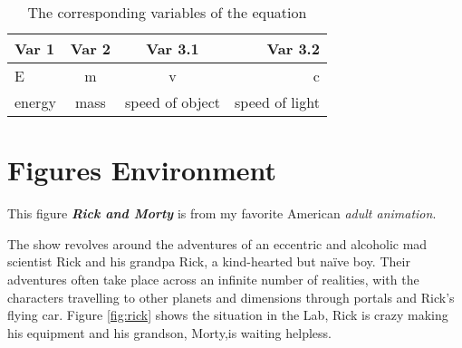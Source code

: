 \documentclass[12pt, letterpaper]{article} %
\begin{document}
\begin{table}[!h] %
  \begin{center} %
  \begin{tabular}{|l|c|c|r|} %
    \hline %
    Var 1 & Var 2 & Var 3.1 & Var 3.2\\ %
    \hline %
    \hline %
    E & m &v & c\\ %
    \hline %
    \hline %
    energy & mass& speed of object & speed of light \\ %
    \hline %
  \end{tabular} %
  \caption{The corresponding variables of the equation } %
  \label{tab:tab1} %
  \end{center} %
\end{table} %





\section{Figures Environment} %
\graphicspath{ {./images/} } %
This figure \textit{\textbf{Rick and Morty }} is from my favorite American \textit{adult animation}.

The show revolves around the adventures of an eccentric and alcoholic mad scientist Rick and his grandpa Rick, 
a kind-hearted but naïve boy. Their adventures often take place across an infinite number of realities, with the 
characters travelling to other planets and dimensions through portals and Rick's flying car. Figure \ref{fig:rick} shows 
the situation in the Lab, Rick is crazy making his equipment and his grandson, Morty,is waiting helpless.
\end{document}
